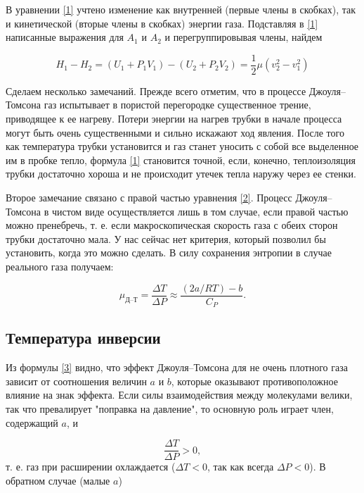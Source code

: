 \documentclass[a4paper,12pt]{article}
\begin{document}
В уравнении \eqref{1} учтено изменение как внутренней (первые члены в скобках), так и кинетической (вторые члены в скобках) энергии газа. Подставляя в \eqref{1} написанные выражения для $ A_1 $ и $ A_2 $ и перегруппировывая члены, найдем

\begin{equation}\label{2}
    H_1 - H_2 = \left( U_1 + P_1 V_1 \right) - \left( U_2 + P_2 V_2 \right) = \frac{1}{2} \mu \left( v^2_2 - v^2_1 \right)
\end{equation}

Сделаем несколько замечаний. Прежде всего отметим, что в процессе Джоуля–Томсона газ испытывает в пористой перегородке существенное трение, приводящее к ее нагреву. Потери энергии на нагрев трубки в начале процесса могут быть очень существенными и сильно искажают ход явления. После того как температура трубки установится и газ станет уносить с собой все выделенное им в пробке тепло, формула \eqref{1} становится точной, если, конечно, теплоизоляция трубки достаточно хороша и не происходит утечек тепла наружу через ее стенки.

Второе замечание связано с правой частью уравнения \eqref{2}. Процесс Джоуля–Томсона в чистом виде осуществляется лишь в том случае, если правой частью можно пренебречь, т. е. если макроскопическая скорость газа с обеих сторон трубки достаточно мала. У нас сейчас нет критерия, который позволил бы установить, когда это можно сделать. В силу сохранения энтропии в случае реального газа получаем:

\begin{equation}\label{3}
    \mu_\text{Д--Т} = \frac{\Delta T}{\Delta P} \approx \frac{(2a/RT) - b}{C_P}.
\end{equation}

\subsection{Температура инверсии}

Из формулы \eqref{3} видно, что эффект Джоуля–Томсона для не очень плотного газа зависит от соотношения величин $a$ и $b$, которые оказывают противоположное влияние на знак эффекта. Если силы взаимодействия между молекулами велики, так что превалирует "поправка на давление", то основную роль играет член, содержащий $a$, и 

\[ \frac{\Delta T}{\Delta P} > 0, \]
т. е. газ при расширении охлаждается ($ \Delta T < 0 $, так как всегда $ \Delta P < 0 $). В обратном случае (малые $ a $)
\end{document}
